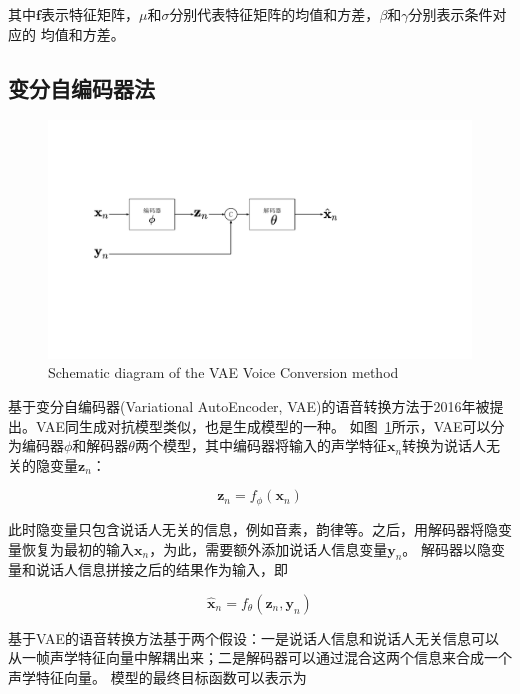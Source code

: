 其中$\mathbf{f}$表示特征矩阵，$\mu$和$\sigma$分别代表特征矩阵的均值和方差，$\beta$和$\gamma$分别表示条件对应的
均值和方差。

\subsection{变分自编码器法}

\begin{figure}[!htp]
    \centering
    \includegraphics[width=13cm,trim=30 150 170 130,clip]{figure/3_vae.pdf}
    {Schematic diagram of the VAE Voice Conversion method}
    \label{fig:vae}
\end{figure}

基于变分自编码器(Variational AutoEncoder, VAE)的语音转换方法于2016年被提出。VAE同生成对抗模型类似，也是生成模型的一种。
如图~\ref{fig:vae}所示，VAE可以分为编码器$\phi$和解码器$\theta$两个模型，其中编码器将输入的声学特征$\mathbf{x}_n$转换为说话人无关的隐变量$\mathbf{z}_n$：

\begin{equation}
    \mathbf{z}_n = f_{\phi}(\mathbf{x}_n)
\end{equation}

此时隐变量只包含说话人无关的信息，例如音素，韵律等。之后，用解码器将隐变量恢复为最初的输入$\mathbf{x}_n$，为此，需要额外添加说话人信息变量$\mathbf{y}_n$。
解码器以隐变量和说话人信息拼接之后的结果作为输入，即

\begin{equation}
    \hat{\mathbf{x}}_n = f_{\theta}(\mathbf{z}_n,\mathbf{y}_n)
\end{equation}

基于VAE的语音转换方法基于两个假设：一是说话人信息和说话人无关信息可以从一帧声学特征向量中解耦出来；二是解码器可以通过混合这两个信息来合成一个声学特征向量。
模型的最终目标函数可以表示为

